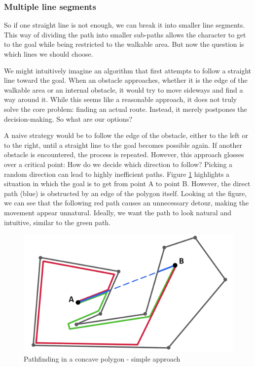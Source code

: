 \subsubsection{Multiple line segments}
So if one straight line is not enough, we can break it into smaller line segments. This way of dividing the path into smaller sub-paths allows the character to get to the goal while being restricted to the walkable area. But now the question is which lines we should choose.

We might intuitively imagine an algorithm that first attempts to follow a straight line toward the goal. When an obstacle approaches, whether it is the edge of the walkable area or an internal obstacle, it would try to move sideways and find a way around it. While this seems like a reasonable approach, it does not truly solve the core problem: finding an actual route. Instead, it merely postpones the decision-making. So what are our options?

A naive strategy would be to follow the edge of the obstacle, either to the left or to the right, until a straight line to the goal becomes possible again. If another obstacle is encountered, the process is repeated. However, this approach glosses over a critical point: How do we decide which direction to follow? Picking a random direction can lead to highly inefficient paths. Figure \ref{fig:Path-P} highlights a situation in which the goal is to get from point A to point B. However, the direct path (blue) is obstructed by an edge of the polygon itself. Looking at the figure, we can see that the following red path causes an unnecessary detour, making the movement appear unnatural. Ideally, we want the path to look natural and intuitive, similar to the green path.

\begin{figure}[H]
\centering
\includegraphics[width=.65\linewidth]{img/polygon-prototyp.png}
\caption{Pathfinding in a concave polygon - simple approach}
\label{fig:Path-P}
\end{figure}

